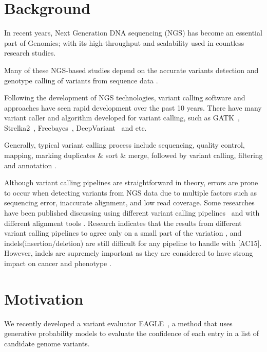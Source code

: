 \hspace{24pt}

\section{Background}
In recent years, Next Generation DNA sequencing (NGS) has become an essential part of Genomics; with its high-throughput and scalability used in countless research studies.

Many of these NGS-based studies depend on the accurate variants detection and genotype calling of variants from sequence data \cite{nielsen2011genotype}.

Following the development of NGS technologies, variant calling software and approaches have seen rapid development over the past 10 years. There have many variant caller and algorithm developed for variant calling, such as GATK~\cite{poplin2018scaling}, Strelka2~\cite{saunders2012strelka}, Freebayes~\cite{garrison2012haplotype}, DeepVariant~\cite{poplin2018universal} and etc.

Generally, typical variant calling process include sequencing, quality control, mapping, marking duplicates \& sort \& merge, followed by variant calling, filtering and annotation \cite{koboldt2020best}.

Although variant calling pipelines are straightforward in theory, errors are prone to occur when detecting variants from NGS data due to multiple factors such as sequencing error, inaccurate alignment, and low read coverage. Some researches have been published discussing using different variant calling pipelines~\cite{bian2018comparing,chen2019systematic} and with different alignment tools \cite{hwang2015systematic,zhao2020accuracy}. Research indicates that the results from different variant calling pipelines to agree only on a small part of the variation \cite{tian2015computational}, and indels(insertion/deletion) are still difficult for any pipeline to handle with [AC15]. However, indels are supremely important as they are considered to have strong impact on cancer\cite{sehn2015insertions} and phenotype \cite{montgomery2013origin}.

\section{Motivation}	
We recently developed a variant evaluator EAGLE~\cite{kuo2018eagle}, a method that uses generative probability models to evaluate the confidence of each entry in a list of candidate genome variants.

